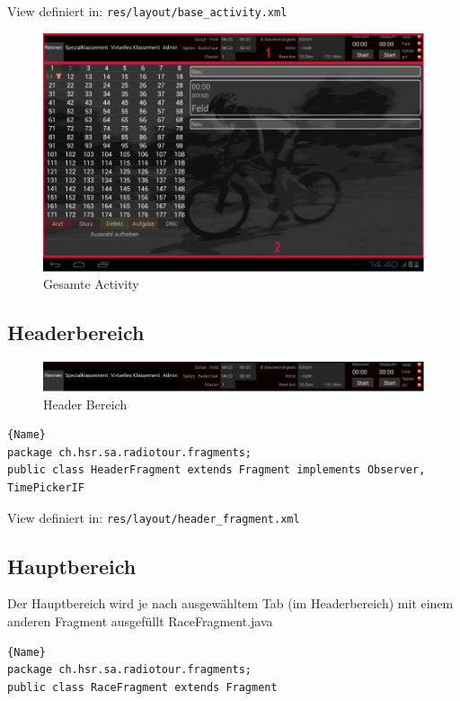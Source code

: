 View definiert in:
\lstinline|res/layout/base_activity.xml|

\begin{figure}[h!]
\caption{Gesamte Activity}
\centering
\includegraphics[scale=0.9]{07anhang/images/dev_activity.png}
\end{figure}

\subsection{Headerbereich}

\begin{figure}[h!]
\caption{Header Bereich}
\centering
\includegraphics[scale=0.9]{07anhang/images/dev_header.png}
\end{figure}


\begin{lstlisting}{Name}
package ch.hsr.sa.radiotour.fragments;
public class HeaderFragment extends Fragment implements Observer, TimePickerIF
\end{lstlisting}

View definiert in:
\lstinline|res/layout/header_fragment.xml|

\subsection{Hauptbereich}
Der Hauptbereich wird je nach ausgewähltem Tab (im Headerbereich) mit einem anderen Fragment ausgefüllt
RaceFragment.java

\begin{lstlisting}{Name}
package ch.hsr.sa.radiotour.fragments;
public class RaceFragment extends Fragment 
\end{lstlisting}


